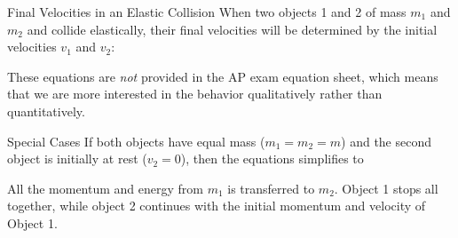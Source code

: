 \documentclass[12pt,compress,aspectratio=169]{beamer}
\begin{document}
%  
%




\begin{frame}{Final Velocities in an Elastic Collision}
  When two objects 1 and 2 of mass $m_1$ and $m_2$ and  collide elastically,
  their final velocities will be determined by the initial velocities $v_1$ and
  $v_2$:
  

  These equations are \emph{not} provided in the AP exam equation sheet, which
  means that we are more interested in the behavior qualitatively rather than
  quantitatively.
\end{frame}




\begin{frame}{Special Cases}
  If both objects have equal mass ($m_1=m_2=m$) and the second object is
  initially at rest ($v_2=0$), then the equations simplifies to
  

  All the momentum and energy from $m_1$ is transferred to $m_2$. Object 1
  stops all together, while object 2 continues with the initial momentum and
  velocity of Object 1.
\end{frame}
\end{document}
